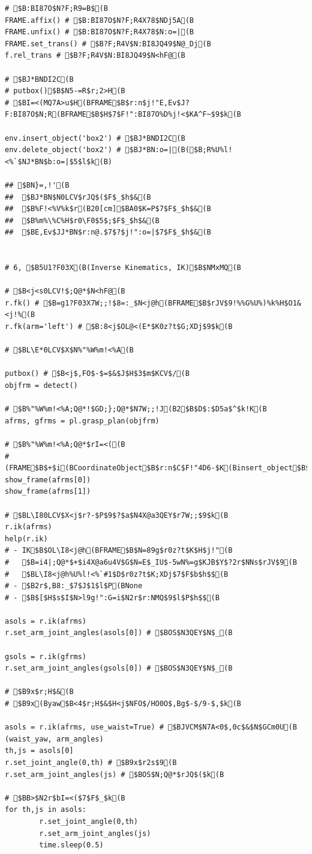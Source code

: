 \documentclass[11pt]{jreport}
\begin{document}
{{{{{{{{{{{{{{\begin{verbatim}
# $B:BI87O$N?F;R9=B$(B
FRAME.affix() # $B:BI87O$N?F;R4X78$NDj5A(B
FRAME.unfix() # $B:BI87O$N?F;R4X78$N:o=|(B
FRAME.set_trans() # $B?F;R4V$N:BI8JQ49$N@_Dj(B
f.rel_trans # $B?F;R4V$N:BI8JQ49$N<hF@(B

# $BJ*BNDI2C(B
# putbox()$B$N5-=R$r;2>H(B
# $BI=<(MQ7A>u$H(BFRAME$B$r:n$j!"E,Ev$J?F:BI87O$N;R(BFRAME$B$H$7$F!":BI87O%D%j!<$KA^F~$9$k(B

env.insert_object('box2') # $BJ*BNDI2C(B
env.delete_object('box2') # $BJ*BN:o=|(B($B;R%U%l!<%`$NJ*BN$b:o=|$5$l$k(B)

## $BN}=,!'(B
##  $BJ*BN$N0LCV$rJQ$($F$_$h$&(B
##  $B%F!<%V%k$r(B20[cm]$BA0$K=P$7$F$_$h$&(B
##  $B%m%\%C%H$r0\F0$5$;$F$_$h$&(B
##  $BE,Ev$JJ*BN$r:n@.$7$?$j!":o=|$7$F$_$h$&(B


# 6, $B5U1?F03X(B(Inverse Kinematics, IK)$B$NMxMQ(B

# $B<j<s0LCV!$;Q@*$N<hF@(B
r.fk() # $B=g1?F03X7W;;!$8=:_$N<j@h(BFRAME$B$rJV$9!%%G%U%)%k%H$O1&<j!%(B
r.fk(arm='left') # $B:8<j$OL@<(E*$K0z?t$G;XDj$9$k(B

# $BL\E*0LCV$X$N%"%W%m!<%A(B

putbox() # $B<j$,FO$-$=$&$J$H$3$m$KCV$/(B
objfrm = detect()

# $B%"%W%m!<%A;Q@*!$GD;};Q@*$N7W;;!J(B2$B$D$:$D5a$^$k!K(B
afrms, gfrms = pl.grasp_plan(objfrm)

# $B%"%W%m!<%A;Q@*$rI=<((B
# (FRAME$B$+$i(BCoordinateObject$B$r:n$C$F!"4D6-$K(Binsert_object$B$9$k(B)
show_frame(afrms[0])
show_frame(afrms[1])

# $BL\I80LCV$X<j$r?-$P$9$?$a$N4X@a3QEY$r7W;;$9$k(B
r.ik(afrms)
help(r.ik)
# - IK$B$OL\I8<j@h(BFRAME$B$N=89g$r0z?t$K$H$j!"(B
#   $B=i4|;Q@*$+$i4X@a6u4V$G$N=E$_IU$-5wN%=g$KJB$Y$?2r$NNs$rJV$9(B
#   $BL\I8<j@h%U%l!<%`#1$D$r0z?t$K;XDj$7$F$b$h$$(B
# - $B2r$,B8:_$7$J$1$l$P(BNone
# - $B$[$H$s$I$N>l9g!":G=i$N2r$r:NMQ$9$l$P$h$$(B

asols = r.ik(afrms)
r.set_arm_joint_angles(asols[0]) # $BOS$N3QEY$N$_(B

gsols = r.ik(gfrms)
r.set_arm_joint_angles(gsols[0]) # $BOS$N3QEY$N$_(B

# $B9x$r;H$&(B
# $B9x(Byaw$B<4$r;H$&$H<j$NFO$/HO0O$,Bg$-$/9-$,$k(B

asols = r.ik(afrms, use_waist=True) # $BJVCM$N7A<0$,0c$&$N$GCm0U(B (waist_yaw, arm_angles)
th,js = asols[0]
r.set_joint_angle(0,th) # $B9x$r2s$9(B
r.set_arm_joint_angles(js) # $BOS$N;Q@*$rJQ$($k(B

# $BB>$N2r$bI=<($7$F$_$k(B
for th,js in asols:
        r.set_joint_angle(0,th)
        r.set_arm_joint_angles(js)
        time.sleep(0.5)


\end{verbatim}}}}}}}}}}}}}}}
\end{document}

